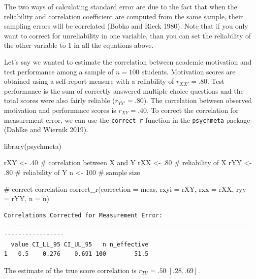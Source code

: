 \documentclass[
  letterpaper,
  DIV=11,
  numbers=noendperiod]{scrreprt}
\newenvironment{Shaded}{}{}
\newcommand{\AttributeTok}[1]{\textcolor[rgb]{0.00,0.34,0.68}{#1}}
\newcommand{\CommentTok}[1]{\textcolor[rgb]{0.54,0.53,0.53}{#1}}
\newcommand{\DecValTok}[1]{\textcolor[rgb]{0.69,0.50,0.00}{#1}}
\newcommand{\FunctionTok}[1]{\textcolor[rgb]{0.39,0.29,0.61}{#1}}
\newcommand{\NormalTok}[1]{\textcolor[rgb]{0.12,0.11,0.11}{#1}}
\newcommand{\OtherTok}[1]{\textcolor[rgb]{0.00,0.43,0.16}{#1}}
\newcommand{\StringTok}[1]{\textcolor[rgb]{0.75,0.01,0.01}{#1}}
\begin{document}
The two ways of calculating standard error are due to the fact that when
the reliability and correlation coefficient are computed from the same
sample, their sampling errors will be correlated (Bobko and Rieck 1980).
Note that if you only want to correct for unreliability in one variable,
than you can set the reliability of the other variable to 1 in all the
equations above.

\begin{tcolorbox}[enhanced jigsaw, opacityback=0, coltitle=black, toprule=.15mm, colframe=quarto-callout-note-color-frame, bottomtitle=1mm, rightrule=.15mm, colbacktitle=quarto-callout-note-color!10!white, left=2mm, bottomrule=.15mm, breakable, title={Applied Example in R}, colback=white, opacitybacktitle=0.6, titlerule=0mm, arc=.35mm, leftrule=.75mm, toptitle=1mm]

Let's say we wanted to estimate the correlation between academic
motivation and test performance among a sample of \(n=100\) students.
Motivation scores are obtained using a self-report measure with a
reliability of \(r_{XX'}=.80\). Test performance is the sum of correctly
answered multiple choice questions and the total scores were also fairly
reliable (\(r_{YY'}=.80\)). The correlation between observed motivation
and performance scores is \(r_{XY}=.40\). To correct the correlation for
measurement error, we can use the \texttt{correct\_r} function in the
\texttt{psychmeta} package (Dahlke and Wiernik 2019).

\begin{Shaded}
\begin{Highlighting}[]
\FunctionTok{library}\NormalTok{(psychmeta)}

\NormalTok{rXY }\OtherTok{\textless{}{-}}\NormalTok{ .}\DecValTok{40}  \CommentTok{\# correlation between X and Y}
\NormalTok{rXX }\OtherTok{\textless{}{-}}\NormalTok{ .}\DecValTok{80}  \CommentTok{\# reliability of X}
\NormalTok{rYY }\OtherTok{\textless{}{-}}\NormalTok{ .}\DecValTok{80}  \CommentTok{\# reliability of Y}
\NormalTok{n }\OtherTok{\textless{}{-}} \DecValTok{100}    \CommentTok{\# sample size}

\CommentTok{\# correct correlation}
\FunctionTok{correct\_r}\NormalTok{(}\AttributeTok{correction =} \StringTok{\textquotesingle{}meas\textquotesingle{}}\NormalTok{,}
          \AttributeTok{rxyi =}\NormalTok{ rXY,}
          \AttributeTok{rxx =}\NormalTok{ rXX,}
          \AttributeTok{ryy =}\NormalTok{ rYY,}
          \AttributeTok{n =}\NormalTok{ n)}
\end{Highlighting}
\end{Shaded}

\begin{verbatim}
Correlations Corrected for Measurement Error:
---------------------------------------------------------------------------------------
  value CI_LL_95 CI_UL_95   n n_effective
1   0.5    0.276    0.691 100        51.5
\end{verbatim}

The estimate of the true score correlation is
\(r_{TU} = .50\;[.28, .69]\).

\end{tcolorbox}
\end{document}

